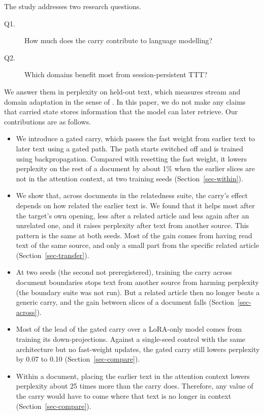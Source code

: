 \documentclass[10pt]{article} %
\begin{document}
The study addresses two research questions.
\begin{description}
  \item[Q1.] How much does the carry contribute to language modelling?
  \item[Q2.] Which domains benefit most from session-persistent TTT?
\end{description}
We answer them in perplexity on held-out text, which measures stream and domain adaptation in the sense of \citet{song2026beyond}. In this paper, we do not make any claims that carried state stores information that the model can later retrieve. Our contributions are as follows.
\begin{itemize}
  \item We introduce a gated carry, which passes the fast weight from earlier text to later text using a gated path. The path starts switched off and is trained using backpropagation. Compared with resetting the fast weight, it lowers perplexity on the rest of a document by about 1\% when the earlier slices are not in the attention context, at two training seeds (Section~\ref{sec-within}).
  \item We show that, across documents in the relatedness suite, the carry's effect depends on how related the earlier text is. We found that it helps most after the target's own opening, less after a related article and less again after an unrelated one, and it raises perplexity after text from another source. This pattern is the same at both seeds. Most of the gain comes from having read text of the same source, and only a small part from the specific related article (Section~\ref{sec-transfer}).
  \item At two seeds (the second not preregistered), training the carry across document boundaries stops text from another source from harming perplexity (the boundary suite was not run). But a related article then no longer beats a generic carry, and the gain between slices of a document falls (Section~\ref{sec-across}).
\item Most of the lead of the gated carry over a LoRA-only model comes from training its down-projections. Against a single-seed control with the same architecture but no fast-weight updates, the gated carry still lowers perplexity by 0.07 to 0.10 (Section~\ref{sec-compare}).
\item Within a document, placing the earlier text in the attention context lowers perplexity about 25 times more than the carry does. Therefore, any value of the carry would have to come where that text is no longer in context (Section~\ref{sec-compare}).
\end{itemize}
\end{document}
